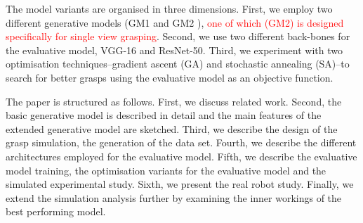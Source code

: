 The model variants are organised in three dimensions. First, we employ two different generative models (GM1 \cite{kopicki2015ijrr} and GM2 \cite{kopicki2019ijrr}), \textcolor{red}{one of which (GM2) is designed specifically for single view grasping}. Second, we use two different back-bones for the evaluative model, VGG-16 and ResNet-50. Third, we experiment with two optimisation techniques--gradient ascent (GA) and stochastic annealing (SA)--to search for better grasps using the evaluative model as an objective function.



The paper is structured as follows. First, we discuss related work. Second, the basic generative model is described in detail and the main features of the extended generative model are sketched. Third, we describe the design of the grasp simulation, the generation of the data set. Fourth, we describe the different architectures employed for the evaluative model. Fifth, we describe the evaluative model training, the optimisation variants for the evaluative model and the simulated experimental study. Sixth, we present the real robot study. Finally, we extend the simulation analysis further by examining the inner workings of the best performing model.
